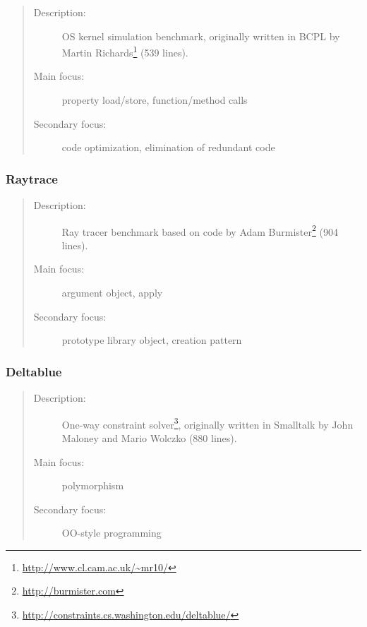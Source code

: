 \documentclass[onecolumn, openright, master, english, signatures]{dbrgrptt}
\begin{document}
\begin{quote}
\begin{description}
\item[Description:] OS kernel simulation benchmark, originally written in BCPL by Martin Richards\footnote{\url{http://www.cl.cam.ac.uk/~mr10/}} (539 lines).
\item[Main focus:] property load/store, function/method calls
\item[Secondary focus:] code optimization, elimination of redundant code
\end{description}
\end{quote}

\subsubsection{Raytrace}

\begin{quote}
\begin{description}
\item[Description:] Ray tracer benchmark based on code by Adam Burmister\footnote{\url{http://burmister.com}} (904 lines).
\item[Main focus:] argument object, apply
\item[Secondary focus:] prototype library object, creation pattern
\end{description}
\end{quote}

\subsubsection{Deltablue}

\begin{quote}
\begin{description}
\item[Description:] One-way constraint solver\footnote{\url{http://constraints.cs.washington.edu/deltablue/}}, originally written in Smalltalk by John Maloney and Mario Wolczko (880 lines).
\item[Main focus:] polymorphism
\item[Secondary focus:] OO-style programming
\end{description}
\end{quote}

\end{document}
